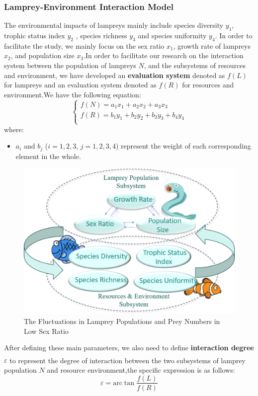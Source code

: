\documentclass[12pt]{article}  %
\newcommand{\upcite}[1]{\textsuperscript{\textsuperscript{\cite{#1}}}}
\begin{document}
\subsubsection{Lamprey-Environment Interaction Model}
The environmental impacts of lampreys mainly include species diversity $y_{1}$, trophic status index $y_{2}$ , species richness $y_{3}$ and species uniformity $y_{4}$. In order to facilitate the study, we mainly focus on the sex ratio $x_{1}$, growth rate of lampreys $x_{2}$, and population size $x_{3}$.In order to facilitate our research on the interaction system between the population of lampreys $N$, and the subsystems of resources and environment, we have developed an \textbf{evaluation system }denoted as $f(L)$ for lampreys and an evaluation system denoted as $f(R)$ for resources and environment.We have the following equation:
\begin{equation}
	\begin{cases}
		f\left( N \right) =a_1x_1+a_2x_2+a_3x_3\\
		f\left( R \right) =b_1y_1+b_2y_2+b_3y_3+b_{4}y_{4}\\
	\end{cases}
\end{equation}
where:
\begin{itemize}
	\setlength{\parsep}{0ex} %
	\setlength{\topsep}{2ex} %
	\setlength{\itemsep}{1ex} %
	\item $a_{i}$ and $ b_{j}$ ($i=1,2,3 $, $j=1,2,3,4$) represent the weight of each corresponding element in the whole.
\end{itemize}

\begin{figure}[H] %
	\centering  %
	\includegraphics[width=.6\textwidth]{图片1.png} %
	\caption{The Fluctuations in  Lamprey Populations and Prey Numbers in Low Sex Ratio}
\end{figure}
After defining these main parameters, we also need to define\textbf{ interaction degree}  $\varepsilon$\upcite{5} to represent the degree of interaction between the two subsystems of lamprey population $N$ and resource environment,the specific expression is as follows:
\begin{equation}
	\varepsilon =\mathrm{arc}\tan \frac{f\left( L \right)}{f\left( R \right)}
\end{equation}
\end{document}
